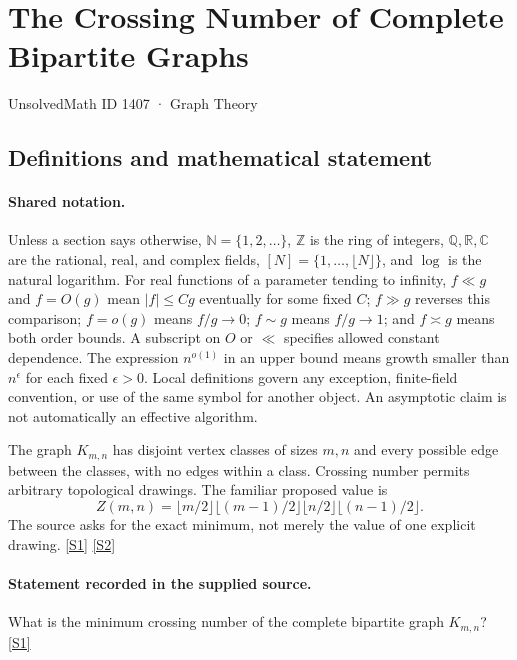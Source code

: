 \documentclass[11pt,a4paper]{article}
\newcommand{\N}{\mathbb{N}}
\newcommand{\Z}{\mathbb{Z}}
\newcommand{\Q}{\mathbb{Q}}
\newcommand{\R}{\mathbb{R}}
\newcommand{\C}{\mathbb{C}}
\newcommand{\sref}[2]{\hyperlink{source:#1:#2}{[S#2]}}
\begin{document}

\setcounter{section}{1406}

\section{The Crossing Number of Complete Bipartite Graphs}\label{1407}

{\small\sffamily UnsolvedMath ID 1407 · Graph Theory}

\subsection{Definitions and mathematical statement}

\paragraph{Shared notation.}Unless a section says otherwise, $\N=\{1,2,\ldots\}$,
$\Z$ is the ring of integers, $\Q,\R,\C$ are the rational, real, and complex
fields, $[N]=\{1,\ldots,\lfloor N\rfloor\}$, and $\log$ is the natural
logarithm. For real functions of a parameter tending to infinity,
$f\ll g$ and $f=O(g)$ mean $|f|\leq Cg$ eventually for some fixed $C$;
$f\gg g$ reverses this comparison; $f=o(g)$ means $f/g\to0$;
$f\sim g$ means $f/g\to1$; and $f\asymp g$ means both order bounds.
A subscript on $O$ or $\ll$ specifies allowed constant dependence.
The expression $n^{o(1)}$ in an upper bound means growth smaller than
$n^\epsilon$ for each fixed $\epsilon>0$. Local definitions govern any
exception, finite-field convention, or use of the same symbol for another
object. An asymptotic claim is not automatically an effective algorithm.



The graph $K_{m,n}$ has disjoint vertex classes of sizes $m,n$ and every possible edge between the classes, with no edges within a class. Crossing number permits arbitrary topological drawings. The familiar proposed value is
\[Z(m,n)=\lfloor m/2\rfloor\lfloor(m-1)/2\rfloor\lfloor n/2\rfloor\lfloor(n-1)/2\rfloor.\]
The source asks for the exact minimum, not merely the value of one explicit drawing. \sref{1407}{1} \sref{1407}{2}

\paragraph{Statement recorded in the supplied source.}
What is the minimum crossing number of the complete bipartite graph $K_{m,n}$? \sref{1407}{1}
\end{document}
